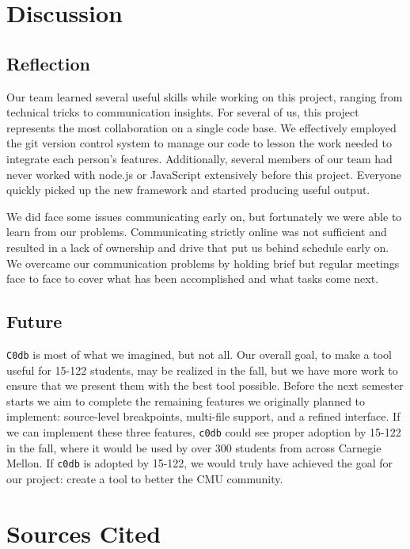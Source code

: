 \documentclass[11pt]{article}
\begin{document}
\section{Discussion}
\subsection{Reflection}
Our team learned several useful skills while working on this project, ranging
from technical tricks to communication insights. For several of us, this project
represents the most collaboration on a single code base. We effectively employed
the git version control system to manage our code to lesson the work needed to
integrate each person's features. Additionally, several members of our team had
never worked with node.js or JavaScript extensively before this project.
Everyone quickly picked up the new framework and started producing useful
output.

We did face some issues communicating early on, but fortunately we were able to
learn from our problems. Communicating strictly online was not sufficient and
resulted in a lack of ownership and drive that put us behind schedule early on.
We overcame our communication problems by holding brief but regular meetings
face to face to cover what has been accomplished and what tasks come next.

\subsection{Future}
{\tt C0db} is most of what we imagined, but not all. Our overall goal, to make a
tool useful for 15-122 students, may be realized in the fall, but we have more
work to ensure that we present them with the best tool possible. Before the next
semester starts we aim to complete the remaining features we originally planned
to implement: source-level breakpoints, multi-file support, and a refined
interface. If we can implement these three features, {\tt c0db} could see proper
adoption by 15-122 in the fall, where it would be used by over 300 students from
across Carnegie Mellon. If {\tt c0db} is adopted by 15-122, we would truly have
achieved the goal for our project: create a tool to better the CMU community.

\section{Sources Cited}
\end{document}
